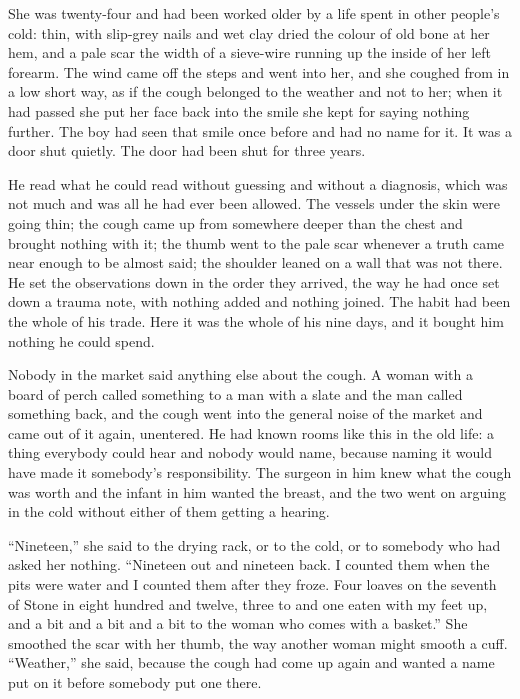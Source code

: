 She was twenty-four and had been worked older by a life spent in other people's cold: thin, with slip-grey nails and wet clay dried the colour of old bone at her hem, and a pale scar the width of a sieve-wire running up the inside of her left forearm. The wind came off the steps and went into her, and she coughed from  in a low short way, as if the cough belonged to the weather and not to her; when it had passed she put her face back into the smile she kept for saying nothing further. The boy had seen that smile once before and had no name for it. It was a door shut quietly. The door had been shut for three years.

He read what he could read without guessing and without a diagnosis, which was not much and was all he had ever been allowed. The vessels under the skin were going thin; the cough came up from somewhere deeper than the chest and brought nothing with it; the thumb went to the pale scar whenever a truth came near enough to be almost said; the shoulder leaned on a wall that was not there. He set the observations down in the order they arrived, the way he had once set down a trauma note, with nothing added and nothing joined. The habit had been the whole of his trade. Here it was the whole of his nine days, and it bought him nothing he could spend.

Nobody in the market said anything else about the cough. A woman with a board of perch called something to a man with a slate and the man called something back, and the cough went into the general noise of the market and came out of it again, unentered. He had known rooms like this in the old life: a thing everybody could hear and nobody would name, because naming it would have made it somebody's responsibility. The surgeon in him knew what the cough was worth and the infant in him wanted the breast, and the two went on arguing in the cold without either of them getting a hearing.

“Nineteen,” she said to the drying rack, or to the cold, or to somebody who had asked her nothing. “Nineteen out and nineteen back. I counted them when the pits were water and I counted them after they froze. Four loaves on the seventh of Stone in eight hundred and twelve, three to  and one eaten with my feet up, and a bit and a bit and a bit to the woman who comes with a basket.” She smoothed the scar with her thumb, the way another woman might smooth a cuff. “Weather,” she said, because the cough had come up again and wanted a name put on it before somebody put one there.

